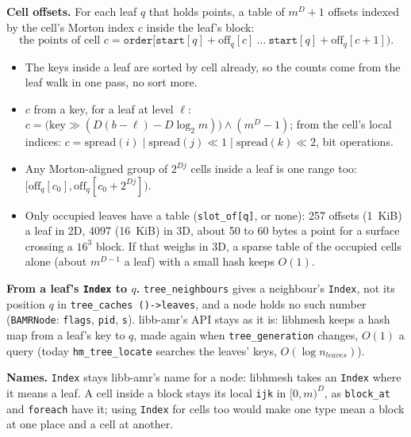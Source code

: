 \documentclass[10pt,a4paper]{article}
\theoremstyle{definition}
\newcommand{\fn}[1]{\texttt{#1}}
\begin{document}
\textbf{Cell offsets.} For each leaf $q$ that holds points, a table of
$m^D + 1$ offsets indexed by the cell's Morton index $c$ inside the leaf's
block:
\[
  \text{the points of cell } c = \fn{order}\big[\fn{start}[q] +
    \mathrm{off}_q[c]\ \ldots\ \fn{start}[q] + \mathrm{off}_q[c + 1]\big).
\]
\begin{itemize}
  \item The keys inside a leaf are sorted by cell already, so the counts come
    from the leaf walk in one pass, no sort more.
  \item $c$ from a key, for a leaf at level $\ell$: $c = \big(\mathrm{key}
    \gg (D (b - \ell) - D \log_2 m)\big) \wedge (m^D - 1)$; from the cell's
    local indices: $c = \mathrm{spread}(i) \mid \mathrm{spread}(j) \ll 1
    \mid \mathrm{spread}(k) \ll 2$, bit operations.
  \item Any Morton-aligned group of $2^{D j}$ cells inside a leaf is one
    range too: $[\mathrm{off}_q[c_0], \mathrm{off}_q[c_0 + 2^{D j}])$.
  \item Only occupied leaves have a table (\fn{slot\_of[q]}, or none): 257
    offsets (1~KiB) a leaf in 2D, 4097 (16~KiB) in 3D, about 50 to 60
    bytes a point for a surface crossing a $16^3$ block. If that weighs in
    3D, a sparse table of the occupied cells alone (about $m^{D-1}$ a leaf)
    with a small hash keeps $O(1)$.
\end{itemize}

\textbf{From a leaf's \fn{Index} to $q$.} \fn{tree\_neighbours} gives a
neighbour's \fn{Index}, not its position $q$ in \fn{tree\_caches
()->leaves}, and a node holds no such number (\fn{BAMRNode}: \fn{flags},
\fn{pid}, \fn{s}). libb-amr's API stays as it is: libhmesh keeps a hash map
from a leaf's key to $q$, made again when \fn{tree\_generation} changes,
$O(1)$ a query (today \fn{hm\_tree\_locate} searches the leaves' keys,
$O(\log n_{leaves})$).

\textbf{Names.} \fn{Index} stays libb-amr's name for a node: libhmesh takes
an \fn{Index} where it means a leaf. A cell inside a block stays its local
\fn{ijk} in $[0, m)^D$, as \fn{block\_at} and \fn{foreach} have it; using
\fn{Index} for cells too would make one type mean a block at one place and
a cell at another.
\end{document}

